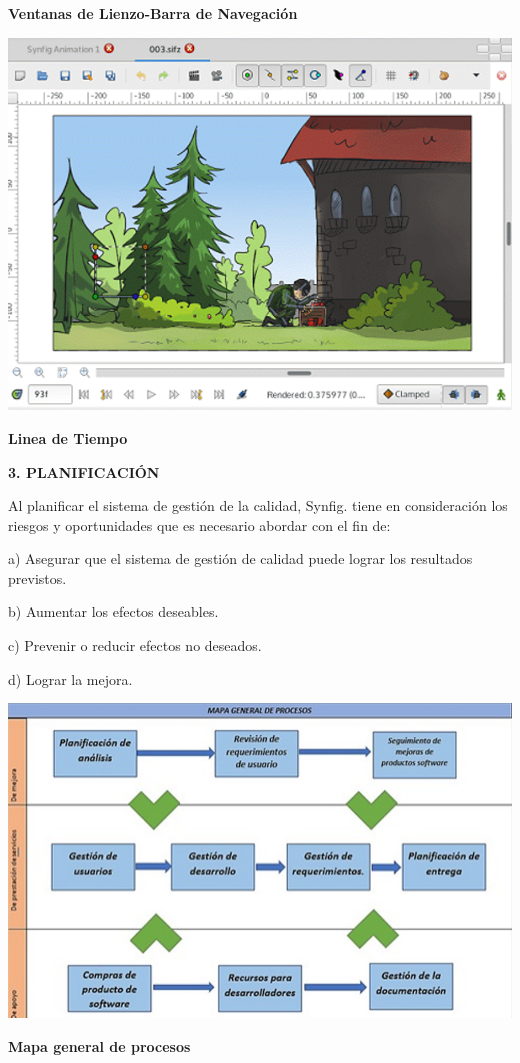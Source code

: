 \documentclass[10pt,a4paper]{article}
\begin{document}
\begin{center}
\textbf{Ventanas de Lienzo-Barra de Navegación}
\vspace{\baselineskip}

\includegraphics[scale=1]{Imagen3.png}

\textbf{Linea de Tiempo}
\vspace{\baselineskip}
\end{center}

\vspace{\baselineskip}
\vspace{\baselineskip}
\vspace{\baselineskip}
\textbf{3. PLANIFICACIÓN}
\vspace{\baselineskip}

Al planificar el sistema de gestión de la calidad, Synfig. tiene en consideración los riesgos y oportunidades que es necesario abordar con el fin de: 

a) Asegurar que el sistema de gestión de calidad puede lograr los resultados previstos. 

b) Aumentar los efectos deseables. 

c) Prevenir o reducir efectos no deseados.

d) Lograr la mejora.  

\begin{center}
\includegraphics[scale=1]{Imagen4.png}

\textbf{Mapa general de procesos}
\vspace{\baselineskip}
\end{center}
\end{document}
